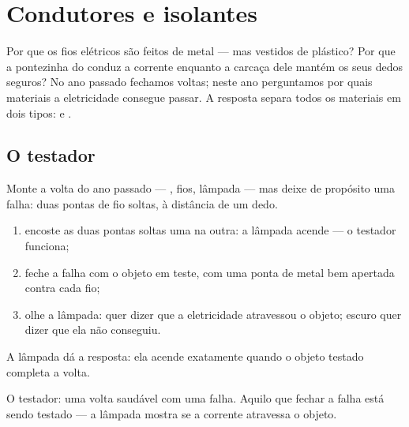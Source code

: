 \chapter{Condutores e isolantes}\label{ch:g4:conductors-insulators}

Por que os fios elétricos são feitos de metal --- mas vestidos de
plástico? Por que a pontezinha do  conduz a corrente
enquanto a carcaça dele mantém os seus dedos seguros? No ano passado
fechamos voltas; neste ano perguntamos por quais materiais a
eletricidade consegue passar. A resposta separa todos os materiais em
dois tipos:  e .

\section{O testador}

\begin{method}\label{met:g4:conductors-insulators:tester}
Monte a volta do ano passado --- , fios, lâmpada --- mas deixe
de propósito uma falha: duas pontas de fio soltas, à distância de um
dedo.
\begin{enumerate}
  \item encoste as duas pontas soltas uma na outra: a lâmpada acende
        --- o testador funciona;
  \item feche a falha com o objeto em teste, com uma ponta de metal
        bem apertada contra cada fio;
  \item olhe a lâmpada:  quer dizer que a eletricidade atravessou
        o objeto; escuro quer dizer que ela não conseguiu.
\end{enumerate}
A lâmpada dá a resposta: ela acende exatamente quando o objeto
testado completa a volta.
\end{method}

\begin{omfigure}

{\small O testador: uma volta saudável com uma falha. Aquilo que
fechar a falha está sendo testado --- a lâmpada mostra se a corrente
atravessa o objeto.}
\end{omfigure}

